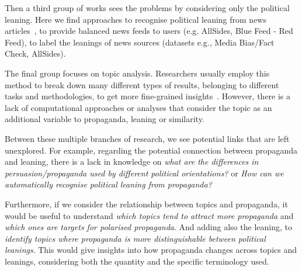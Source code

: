 Then a third group of works sees the problems by considering only the political leaning. Here we find approaches to recognise political leaning from news articles~\citep{baly2020we}, to provide balanced news feeds to users (e.g. AllSides, Blue Feed - Red Feed), to label the leanings of news sources (datasets e.g., Media Bias/Fact Check, AllSides).

The final group focuses on topic analysis. Researchers usually employ this method to break down many different types of results, belonging to different tasks and methodologies, to get more fine-grained insights~\citep{zhang2023strategic}.
However, there is a lack of computational approaches or analyses that consider the topic as an additional variable to propaganda, leaning or similarity.


Between these multiple branches of research, we see potential links that are left unexplored.
For example, regarding the potential connection between propaganda and leaning, there is a lack in knowledge on \emph{what are the differences in persuasion/propaganda used by different political orientations?} or \emph{How can we automatically recognise political leaning from propaganda?}

Furthermore, if we consider the relationship between topics and propaganda, it would be useful to understand \emph{which topics tend to attract more propaganda} and \emph{which ones are targets for polarised propaganda}. And adding also the leaning, to \emph{identify topics where propaganda is more distinguishable between political leanings}. 
This would give insights into how propaganda changes across topics and leanings, considering both the quantity and the specific terminology used.



